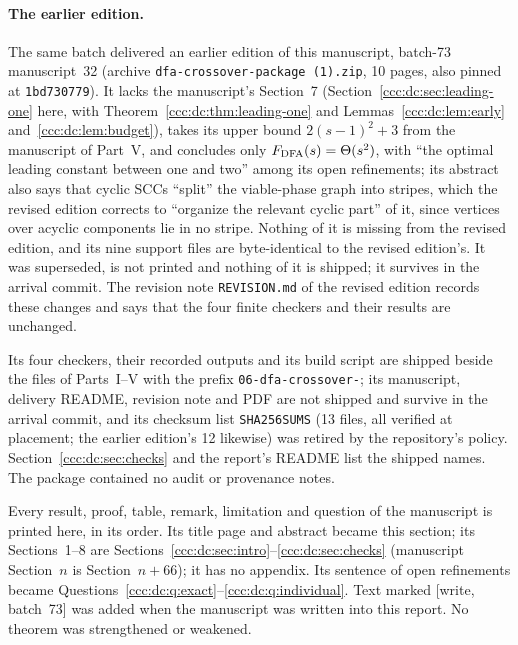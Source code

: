 \documentclass[11pt,letterpaper]{article}
\theoremstyle{definition}
\theoremstyle{remark}
\newcommand{\wsevthree}{\textup{[write, batch~73]}}
\begin{document}
\paragraph{The earlier edition.} The same batch delivered an earlier edition
of this manuscript, batch-73 manuscript~32 (archive
\texttt{dfa-crossover-package~(1).zip}, 10 pages, also pinned at
\texttt{1bd730779}). It lacks the manuscript's Section~7
(Section~\ref{ccc:dc:sec:leading-one} here, with
Theorem~\ref{ccc:dc:thm:leading-one} and
Lemmas~\ref{ccc:dc:lem:early} and~\ref{ccc:dc:lem:budget}), takes its upper
bound $2(s-1)^2+3$ from the manuscript of Part~V, and concludes only
$F_{\rm DFA}(s)=\Theta(s^2)$, with ``the optimal leading constant between one
and two'' among its open refinements; its abstract also says that cyclic
SCCs ``split'' the viable-phase graph into stripes, which the revised edition
corrects to ``organize the relevant cyclic part'' of it, since vertices over
acyclic components lie in no stripe. Nothing of it is missing from the
revised edition, and its nine support files are byte-identical to the
revised edition's. It was superseded, is not printed and nothing of it is
shipped; it survives in the arrival commit. The revision note
\texttt{REVISION.md} of the revised edition records these changes and says
that the four finite checkers and their results are unchanged.

Its four checkers, their recorded outputs and its build script are shipped
beside the files of Parts~I--V with the prefix
\nolinkurl{06-dfa-crossover-}; its manuscript, delivery
README, revision note and PDF are not shipped and survive in the arrival
commit, and its checksum list \texttt{SHA256SUMS} (13 files, all verified at
placement; the earlier edition's 12 likewise) was retired by the
repository's policy. Section~\ref{ccc:dc:sec:checks} and the report's README
list the shipped names. The package contained no audit or provenance notes.

Every result, proof, table, remark, limitation and question of the
manuscript is printed here, in its order. Its title page and abstract became
this section; its Sections~1--8 are
Sections~\ref{ccc:dc:sec:intro}--\ref{ccc:dc:sec:checks} (manuscript
Section~$n$ is Section~$n+66$); it has no appendix. Its sentence of open
refinements became
Questions~\ref{ccc:dc:q:exact}--\ref{ccc:dc:q:individual}. Text marked
\wsevthree{} was added when the manuscript was written into this report. No
theorem was strengthened or weakened.
\end{document}
